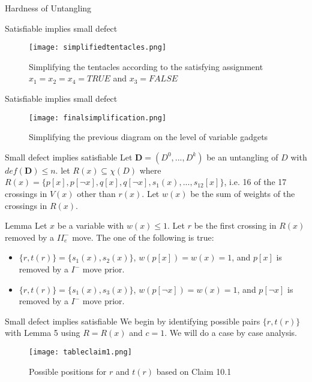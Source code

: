 \documentclass{beamer}
\begin{document}
\begin{section}{Hardness of Untangling}
    \begin{frame}{Satisfiable implies small defect}
        \begin{figure}
            \texttt{[image: simplifiedtentacles.png]}
            \caption{Simplifying the tentacles according to the satisfying assignment $x_1=x_2=x_4=TRUE$ and $x_3=FALSE$}
        \end{figure}
    \end{frame}{}
    
    \begin{frame}{Satisfiable implies small defect}
        \begin{figure}
            \texttt{[image: finalsimplification.png]}
            \caption{Simplifying the previous diagram on the level of variable gadgets}
        \end{figure}
    \end{frame}{}
    
    \begin{frame}{Small defect implies satisfiable}
        Let $\mathbf{D}=(D^0,...,D^k)$ be an untangling of $D$ with $def(\textbf{D})\leq n$. let $R(x)\subseteq \chi (D)$ where $R(x)= \{p[x],p[\neg x], q[x], q[\neg x], s_1(x),...,s_{12}[x]\}$, i.e. 16 of the 17 crossings in $V(x)$ other than $r(x)$. Let $w(x)$ be the sum of weights of the crossings in $R(x)$. 
        
        \begin{block}{Lemma}
            Let $x$ be a variable with $w(x) \leq 1$. Let $r$ be the first crossing in $R(x)$ removed by a $II^-_e$ move. The one of the following is true:
            \begin{itemize}
                \item $\{r,t(r)\}=\{s_1(x),s_2(x)\}$, $w(p[x])=w(x)=1$, and $p[x]$ is removed by a $I^-$ move prior.
                \item $\{r,t(r)\}=\{s_1(x),s_3(x)\}$, $w(p[\neg x])=w(x)=1$, and $p[\neg x]$ is removed by a $I^-$ move prior.
            \end{itemize}{}
        \end{block}{}
    \end{frame}
    
    \begin{frame}{Small defect implies satisfiable}
        We begin by identifying possible pairs $\{r,t(r)\}$ with Lemma 5 using $R=R(x)$ and $c=1$. We will do a case by case analysis. 
        \begin{figure}
            \texttt{[image: tableclaim1.png]}
            \caption{Possible positions for $r$ and $t(r)$ based on Claim 10.1}
        \end{figure}
    \end{frame}{}
    

\end{section}
\end{document}

